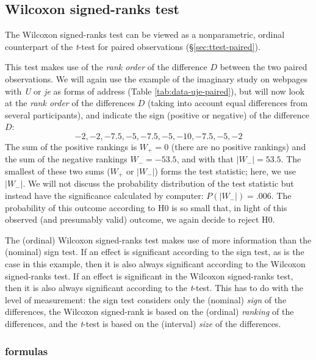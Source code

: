 \documentclass[
]{book}
\begin{document}
\hypertarget{sec:Wilcoxon-signed-rank}{%
\subsection{Wilcoxon signed-ranks test}\label{sec:Wilcoxon-signed-rank}}

The Wilcoxon signed-ranks test can be viewed as a
nonparametric, ordinal counterpart of the \emph{t}-test for paired
observations (§\ref{sec:ttest-paired}).

This test makes use of the \emph{rank order} of the difference \(D\) between
the two paired observations. We will again use the example of the imaginary
study on webpages with \emph{U} or \emph{je} as forms of
address
(Table \ref{tab:data-uje-paired}), but will now look at the \emph{rank order}
of the differences \(D\) (taking into account equal differences from several
participants), and indicate the sign (positive or
negative) of the difference \(D\):
\[-2, -2, -7.5, -5, -7.5, -5, -10, -7.5, -5, -2\]
The sum of the positive rankings is \(W_+=0\) (there are no positive rankings)
and the sum of the negative rankings \(W_-= -53.5\), and with that \(|W_-|=53.5\).
The smallest of
these two sums (\(W_+\) or \(|W_-|\)) forms the test statistic; here, we use
\(|W_-|\).
We will not discuss the probability distribution of the test statistic
but instead have the significance calculated by computer: \(P(|W_-|)=.006\). The
probability of this outcome according to H0 is so small that, in light of this
observed (and presumably valid)
outcome, we again decide to reject H0.

The (ordinal) Wilcoxon signed-ranks test makes use of more information
than the (nominal) sign test. If an effect is significant according to the sign
test, as is the case in this example, then it is also always significant
according to the Wilcoxon signed-ranks test. If an effect is significant
in the Wilcoxon signed-ranks test, then it is also always significant according
to the \emph{t}-test. This has to do with the level of measurement: the sign test
considers only the (nominal) \emph{sign} of the differences, the
Wilcoxon signed-rank is based on the (ordinal) \emph{ranking} of the
differences, and the \emph{t}-test is based on the (interval) \emph{size} of the
differences.

\hypertarget{formulas-7}{%
\subsubsection{formulas}\label{formulas-7}}
\end{document}

